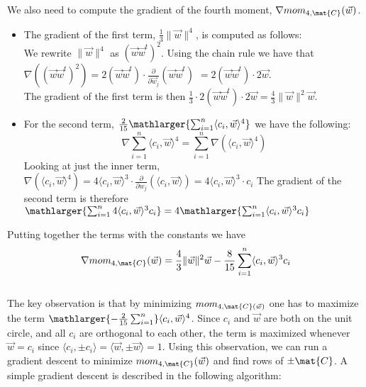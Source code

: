 We also need to compute the gradient of the fourth moment, $\nabla mom_{4, \mat{C}} (\vec{w})$.
\begin{itemize}
    \item The gradient of the first term, $\frac{1}{3} \lVert \vec{w} \rVert ^4$, is computed as follows: \\
        We rewrite $\lVert \vec{w} \rVert ^4$ as $(\vec{w}\vec{w}^t)^2$. Using the chain rule we have that \\
        $\nabla ((\vec{w}\vec{w}^t)^2) = 2(\vec{w}\vec{w}^t) \cdot \frac{\partial}{\partial \vec{w}_j}(\vec{w}\vec{w}^t)$
        $= 2(\vec{w}\vec{w}^t) \cdot 2 \vec{w}$. \\ 
        The gradient of the first term is then $\frac{1}{3} \cdot 2(\vec{w}\vec{w}^t) \cdot 2 \vec{w} = \frac{4}{3} \lVert \vec{w} \rVert ^2 \vec{w}$.
    \item For the second term, $\frac{2}{15} \mathlarger{\sum_{i=1}^{n} \langle c_i, \vec{w} \rangle ^4}$ we have the following:
        \[\nabla \sum_{i=1}^{n}\langle c_i, \vec{w} \rangle ^4 = \sum_{i=1}^{n}\nabla (\langle c_i, \vec{w} \rangle ^4)\]
        Looking at just the inner term, $\nabla (\langle c_i, \vec{w} \rangle ^4) = 4 \langle c_i, \vec{w} \rangle ^3 
        \cdot \frac{\partial}{\partial w_j} (\langle c_i, \vec{w} \rangle) = 4 \langle c_i, \vec{w} \rangle ^3 \cdot c_i$
        The gradient of the second term is therefore $\mathlarger{\sum_{i=1}^{n} 4 \langle c_i, \vec{w} \rangle ^3 c_i} 
        = 4 \mathlarger{\sum_{i=1}^{n} \langle c_i, \vec{w} \rangle ^3 c_i}$
\end{itemize}
Putting together the terms with the constants we have 
\[ \nabla mom_{4, \mat{C}}(\vec{w}) =  \frac{4}{3} \lVert \vec{w} \rVert ^2 \vec{w} - \frac{8}{15} \sum_{i=1}^{n} \langle c_i, \vec{w} \rangle ^3 c_i\] \\
The key observation is that by minimizing $mom_{4, \mat{C}(\vec{w})}$ one has to maximize the term 
$ \mathlarger{-\frac{2}{15}\sum_{i=1}^{n}} \langle c_i, \vec{w} \rangle ^4$. Since $c_i$ and $\vec{w}$ are both on the unit circle, and
all $c_i$ are orthogonal to each other, the term is maximized whenever $\vec{w} = c_i$ since $\langle c_i, \pm c_i \rangle = \langle \vec{w}, \pm \vec{w} \rangle = 1$.
Using this observation, we can run a gradient descent to minimize $mom_{4, \mat{C}}(\vec{w})$ and find rows of $\pm \mat{C}$.
A simple gradient descent is described in the following algorithm:

